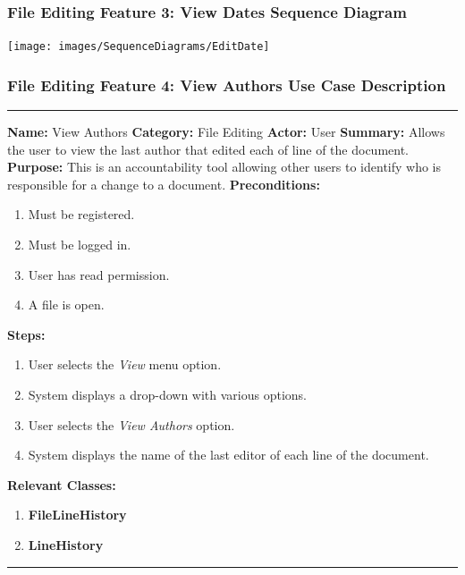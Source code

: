 \documentclass[twoside,letterpaper]{article}
\begin{document}
\subsubsection[File Editing Feature 3: View Dates Sequence Diagram]{\rmfamily\bfseries\color{black}
	File Editing Feature 3: View Dates Sequence Diagram}
\hypertarget{RefHeading22059017292}{}

\bigskip

\texttt{[image: images/SequenceDiagrams/EditDate]}

\newpage

\subsubsection[File Editing Feature 4: View Authors]{\rmfamily\bfseries\color{black}
	File Editing Feature 4: View Authors Use Case Description}
\hypertarget{RefHeading22059017292}{}

\vspace{2pt}
\hrule
\vspace{8pt}
	\noindent\textbf{Name:} View Authors \newline
	\noindent\textbf{Category:} File Editing \newline
	\noindent\textbf{Actor:} User \newline
	\noindent\textbf{Summary:} Allows the user to view the last author that edited each of line of the document. \newline
	\noindent\textbf{Purpose:} This is an accountability tool allowing other users to identify who is responsible for a change to a document. \newline
	\noindent\textbf{Preconditions:}
	\begin{enumerate}
		\item Must be registered.
		\item Must be logged in.
		\item User has read permission.
		\item A file is open.
	\end{enumerate}
	\noindent\textbf{Steps:}
	\begin{enumerate}
		\item User selects the \textit{View} menu option.
		\item System displays a drop-down with various options.
		\item User selects the \textit{View Authors} option.
		\item System displays the name of the last editor of each line of the document.
	\end{enumerate}
	\noindent\textbf{Relevant Classes:}
	\begin{enumerate}
		\item \textbf {FileLineHistory}
		\item \textbf {LineHistory}
	\end{enumerate}
\vspace{8pt}
\hrule
\newpage
\end{document}
